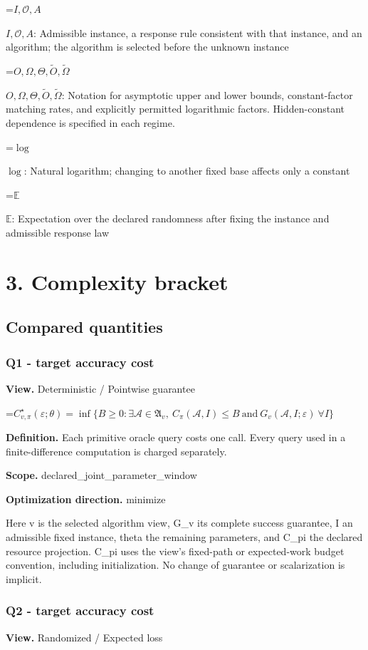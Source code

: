 \documentclass[10pt,a4paper]{article}
\newcommand{\AtlasMath}[1]{\par\begingroup\centering\setbox0=\hbox{$\displaystyle #1$}\ifdim\wd0>1.4\linewidth\typeout{ATLAS WIDE FORMULA: \the\wd0}\fi\ifdim\wd0>\linewidth\resizebox{\linewidth}{!}{\box0}\else\box0\fi\par\endgroup}
\newcommand{\AtlasInlineMath}[1]{\begingroup\setbox0=\hbox{$#1$}\ifdim\wd0>.4\linewidth\endgroup\AtlasMath{#1}\else\endgroup$#1$\fi}
\begin{document}
\AtlasInlineMath{I,\mathcal{O},A}: Admissible instance, a response rule consistent with that instance, and an algorithm; the algorithm is selected before the unknown instance

\AtlasInlineMath{O,\Omega,\Theta,\widetilde{O},\widetilde\Omega}: Notation for asymptotic upper and lower bounds, constant-factor matching rates, and explicitly permitted logarithmic factors. Hidden-constant dependence is specified in each regime.

\AtlasInlineMath{\log}: Natural logarithm; changing to another fixed base affects only a constant

\AtlasInlineMath{\mathbb{E}}: Expectation over the declared randomness after fixing the instance and admissible response law

\section{3. Complexity bracket}
\subsection{Compared quantities}
\subsubsection{Q1 - target accuracy cost}
\textbf{View.} Deterministic / Pointwise guarantee

\AtlasMath{C^\star_{v,\pi}(\varepsilon;\theta)=\inf\{B\ge0:\exists\mathcal A\in\mathfrak A_v,\ C_\pi(\mathcal A,I)\le B\ \text{and}\ G_v(\mathcal A,I;\varepsilon)\ \forall I\}}
\textbf{Definition.} Each primitive oracle query costs one call. Every query used in a finite-difference computation is charged separately.

\textbf{Scope.} declared\_joint\_parameter\_window

\textbf{Optimization direction.} minimize

Here v is the selected algorithm view, G\_v its complete success guarantee, I an admissible fixed instance, theta the remaining parameters, and C\_pi the declared resource projection. C\_pi uses the view's fixed-path or expected-work budget convention, including initialization. No change of guarantee or scalarization is implicit.

\subsubsection{Q2 - target accuracy cost}
\textbf{View.} Randomized / Expected loss
\end{document}
